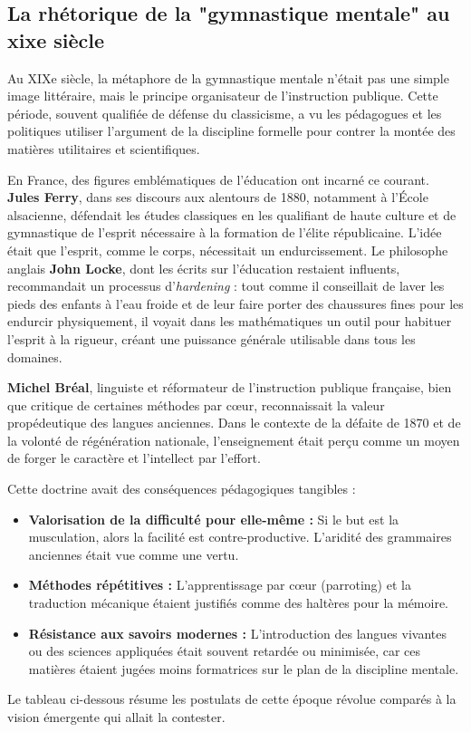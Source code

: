 \subsection{La rhétorique de la "gymnastique mentale" au xixe siècle}

Au XIXe siècle, la métaphore de la gymnastique mentale n'était pas une simple image littéraire, mais
le principe organisateur de l'instruction publique. Cette période, souvent qualifiée de \og défense
du classicisme\fg{}, a vu les pédagogues et les politiques utiliser l'argument de la discipline
formelle pour contrer la montée des matières utilitaires et scientifiques.

En France, des figures emblématiques de l'éducation ont incarné ce courant. \textbf{Jules Ferry},
dans ses discours aux alentours de 1880, notamment à l'École alsacienne, défendait les études
classiques en les qualifiant de \og haute culture\fg{} et de \og gymnastique de l'esprit\fg{}
nécessaire à la formation de l'élite républicaine.\cite{II-1-1-ref10} L'idée était que l'esprit,
comme le corps, nécessitait un \og endurcissement\fg{}. Le philosophe anglais \textbf{John Locke},
dont les écrits sur l'éducation restaient influents, recommandait un processus d'\textit{hardening}
: tout comme il conseillait de laver les pieds des enfants à l'eau froide et de leur faire porter
des chaussures fines pour les endurcir physiquement, il voyait dans les mathématiques un outil pour
habituer l'esprit à la rigueur, créant une \og puissance\fg{} générale utilisable dans tous les
domaines.\cite{II-1-1-ref5}

\textbf{Michel Bréal}, linguiste et réformateur de l'instruction publique française, bien que
critique de certaines méthodes par cœur, reconnaissait la valeur propédeutique des langues
anciennes. Dans le contexte de la défaite de 1870 et de la volonté de régénération nationale,
l'enseignement était perçu comme un moyen de forger le caractère et l'intellect par
l'effort.\cite{II-1-1-ref3}

Cette doctrine avait des conséquences pédagogiques tangibles :

\begin{itemize}\item \textbf{Valorisation de la difficulté pour elle-même :} Si le but est la musculation, alors la facilité est contre-productive. L'aridité des grammaires anciennes était vue comme une vertu.\item \textbf{Méthodes répétitives :} L'apprentissage par cœur (\og parroting\fg{}) et la traduction mécanique étaient justifiés comme des \og haltères\fg{} pour la mémoire.\cite{II-1-1-ref1}\item \textbf{Résistance aux savoirs modernes :} L'introduction des langues vivantes ou des sciences appliquées était souvent retardée ou minimisée, car ces matières étaient jugées moins \og formatrices\fg{} sur le plan de la discipline mentale.\cite{II-1-1-ref5}\end{itemize}Le tableau ci-dessous résume les postulats de cette époque révolue comparés à la vision émergente
qui allait la contester.

